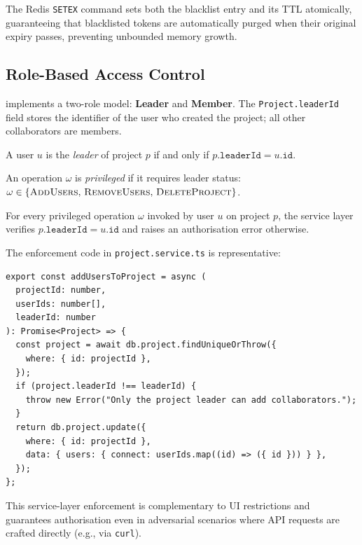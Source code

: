 The Redis \texttt{SETEX} command sets both the blacklist entry and its TTL
atomically, guaranteeing that blacklisted tokens are automatically purged when
their original expiry passes, preventing unbounded memory growth.

\subsection{Role-Based Access Control}

\echoray{} implements a two-role model: \textbf{Leader} and \textbf{Member}.
The \texttt{Project.leaderId} field stores the identifier of the user who
created the project; all other collaborators are members.

\begin{definition}
  A user $u$ is the \emph{leader} of project $p$ if and only if
  $p.\texttt{leaderId} = u.\texttt{id}$.
\end{definition}

\begin{definition}
  An operation $\omega$ is \emph{privileged} if it requires leader status:
  $\omega \in \{\textsc{AddUsers},\, \textsc{RemoveUsers},\, \textsc{DeleteProject}\}$.
\end{definition}

\begin{proposition}
  For every privileged operation $\omega$ invoked by user $u$ on project $p$,
  the service layer verifies $p.\texttt{leaderId} = u.\texttt{id}$ and raises
  an authorisation error otherwise.
\end{proposition}

The enforcement code in \texttt{project.service.ts} is representative:

\begin{lstlisting}[caption={RBAC guard in project service.}, label=lst:rbac]
export const addUsersToProject = async (
  projectId: number,
  userIds: number[],
  leaderId: number
): Promise<Project> => {
  const project = await db.project.findUniqueOrThrow({
    where: { id: projectId },
  });
  if (project.leaderId !== leaderId) {
    throw new Error("Only the project leader can add collaborators.");
  }
  return db.project.update({
    where: { id: projectId },
    data: { users: { connect: userIds.map((id) => ({ id })) } },
  });
};
\end{lstlisting}

This service-layer enforcement is complementary to UI restrictions and
guarantees authorisation even in adversarial scenarios where API requests are
crafted directly (e.g., via \texttt{curl}).

